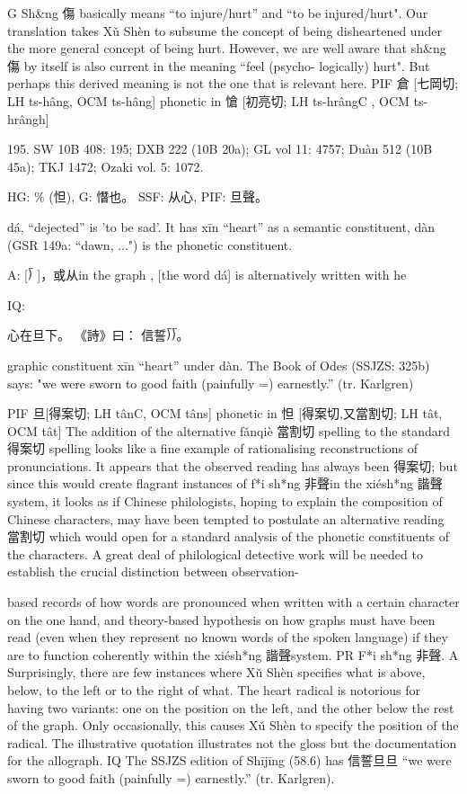 {G      Sh&ng 傷 basically means ``to injure/hurt'' and ``to be injured/hurt". Our translation takes Xǔ Shèn to subsume the concept of being disheartened under the more general concept of being hurt. However, we are well aware that sh&ng 傷 by itself is also current in the meaning ``feel (psycho- logically) hurt". But perhaps this derived meaning is not the one that is relevant here.
PIF 倉 [七岡切; LH ts-hâng, OCM ts-hâng] phonetic in 愴 [初亮切; LH ts-hrângC , OCM ts- hrângh]


195. SW 10B 408: 195; DXB 222 (10B 20a); GL vol 11: 4757; Duàn 512 (10B 45a); TKJ 1472; Ozaki vol. 5: 1072.

HG: \% (怛),
G:	憯也。
SSF: 从心,
PIF: 旦聲。


dá, ``dejected'' is 'to be sad'.
It has xīn ``heart'' as a semantic constituent,
dàn (GSR 149a: ``dawn, ...") is the phonetic constituent.

A:	[⟌ ]，或从in the graph , [the word dá] is alternatively written with he


IQ:

心在旦下。
《詩》曰： 信誓⟌⟌。

graphic constituent xīn ``heart'' under dàn. The Book of Odes (SSJZS: 325b) says:
"we were sworn to good faith (painfully =) earnestly.'' (tr. Karlgren)

PIF    旦[得案切; LH tânC, OCM tâns] phonetic in 怛 [得案切,又當割切; LH tât, OCM tât]
    The addition of the alternative fǎnqiè 當割切 spelling to the standard 得案切 spelling looks like a fine example of rationalising reconstructions of pronunciations. It appears that the observed reading has always been 得案切; but since this would create flagrant instances of f*i sh*ng 非聲in the xiésh*ng 諧聲 system, it looks as if Chinese philologists, hoping to explain the composition of Chinese characters, may have been tempted to postulate an alternative reading 當割切 which would open for a standard analysis of the phonetic constituents of the characters. A great deal of philological detective work will be needed to establish the crucial distinction between observation-




based records of how words are pronounced when written with a certain character on the one hand, and theory-based hypothesis on how graphs must have been read (even when they represent no known words of the spoken language) if they are to function coherently within the xiésh*ng 諧聲system.
PR     F*i sh*ng 非聲.
A   Surprisingly, there are few instances where Xǔ Shèn specifies what is above, below, to the left or to the right of what. The heart radical is notorious for having two variants: one on the position on the left, and the other below the rest of the graph. Only occasionally, this causes Xǔ Shèn to specify the position of the radical.
The illustrative quotation illustrates not the gloss but the documentation for the allograph.
IQ The SSJZS edition of Shījīng (58.6) has 信誓旦旦 ``we were sworn to good faith (painfully =) earnestly.'' (tr. Karlgren).


}
